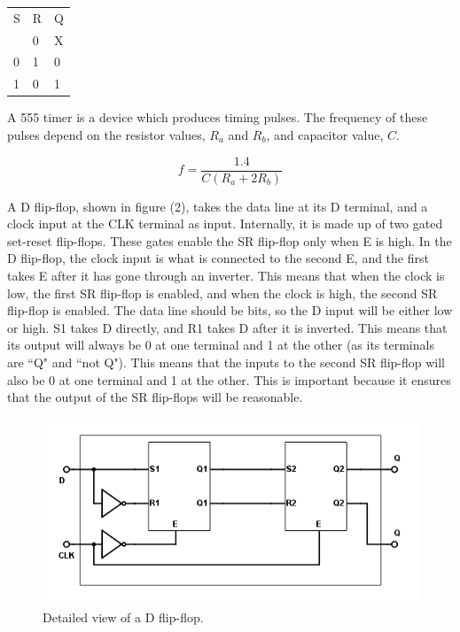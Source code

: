 \documentclass[twocolumn, amsmath]{revtex4}
\begin{document}
\begin{center}
	\begin{ruledtabular}
    \begin{tabular}{ l l l}
	S & R & Q\\ \colrule
	0 & 0 & X \\
	0 & 1 & 0 \\
	1 & 0 & 1
\end{tabular}
    \end{ruledtabular}
\end{center}

A 555 timer is a device which produces timing pulses. The frequency of these pulses depend on the resistor values, $R_a$ and $R_b$, and capacitor value, $C$.

\begin{equation}
f = \frac{1.4}{C(R_a + 2R_b)}
\end{equation}

A D flip-flop, shown in figure (2), takes the data line at its D terminal, and a clock input at the CLK terminal as input. Internally, it is made up of two gated set-reset flip-flops. These gates enable the SR flip-flop only when E is high. In the D flip-flop, the clock input is what is connected to the second E, and the first takes E after it has gone through an inverter. This means that when the clock is low, the first SR flip-flop is enabled, and when the clock is high, the second SR flip-flop is enabled. 
The data line should be bits, so the D input will be either low or high. S1 takes D directly, and R1 takes D after it is inverted. This means that its output will always be 0 at one terminal and 1 at the other (as its terminals are ``Q" and ``not Q"). This means that the inputs to the second SR flip-flop will also be 0 at one terminal and 1 at the other. This is important because it ensures that the output of the SR flip-flops will be reasonable.

\begin{figure}[h]
    \includegraphics[scale=0.45]{dflipflop}  
    \caption{Detailed view of a D flip-flop.}
\end{figure}
\end{document}
